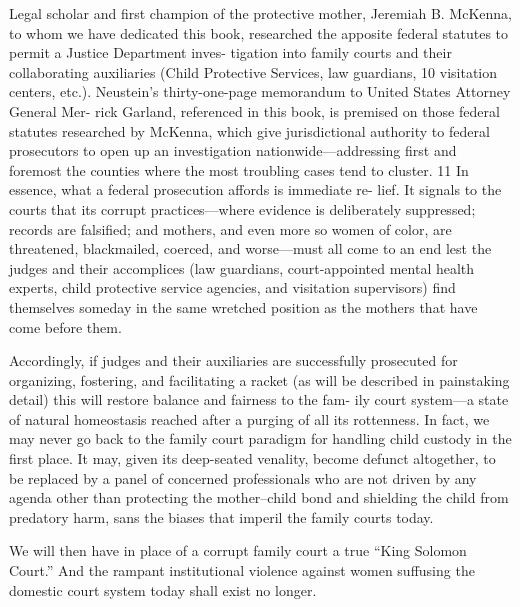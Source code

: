 Legal scholar and first champion of the protective mother, Jeremiah
B. McKenna, to whom we have dedicated this book, researched
the apposite federal statutes to permit a Justice Department inves-
tigation into family courts and their collaborating auxiliaries (Child
Protective Services, law guardians, 10 visitation centers, etc.). Neustein’s
thirty-one-page memorandum to United States Attorney General Mer-
rick Garland, referenced in this book, is premised on those federal
statutes researched by McKenna, which give jurisdictional authority to
federal prosecutors to open up an investigation nationwide—addressing
first and foremost the counties where the most troubling cases tend to
cluster. 11 In essence, what a federal prosecution affords is immediate re-
lief. It signals to the courts that its corrupt practices—where evidence
is deliberately suppressed; records are falsified; and mothers, and even
more so women of color, are threatened, blackmailed, coerced, and
worse—must all come to an end lest the judges and their accomplices
(law guardians, court-appointed mental health experts, child protective
service agencies, and visitation supervisors) find themselves someday in
the same wretched position as the mothers that have come before them. \pfl{}


Accordingly, if judges and their auxiliaries are successfully prosecuted
for organizing, fostering, and facilitating a racket (as will be described
in painstaking detail) this will restore balance and fairness to the fam-
ily court system—a state of natural homeostasis reached after a purging
of all its rottenness. In fact, we may never go back to the family court
paradigm for handling child custody in the first place. It may, given
its deep-seated venality, become defunct altogether, to be replaced by a
panel of concerned professionals who are not driven by any agenda other
than protecting the mother–child bond and shielding the child from
predatory harm, sans the biases that imperil the family courts today. \pfl{}


We will then have in place of a corrupt family court a true “King
Solomon Court.” And the rampant institutional violence against women
suffusing the domestic court system today shall exist no longer. \pfl{}






